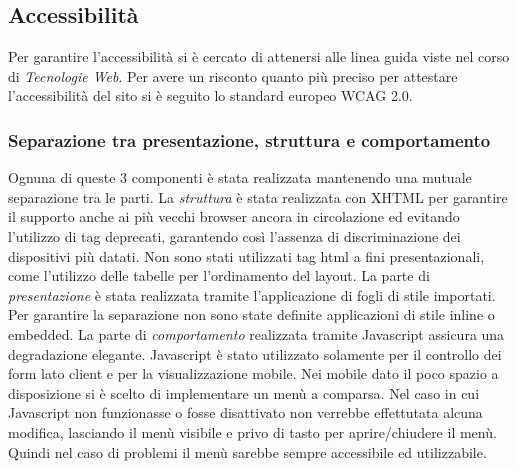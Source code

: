 \subsection{Accessibilità}
Per garantire l'accessibilità si è cercato di attenersi alle linea guida viste nel corso di \textit{Tecnologie Web}. Per avere un risconto quanto più preciso per attestare l'accessibilità del sito si è seguito lo standard europeo WCAG 2.0.
\subsubsection{Separazione tra presentazione, struttura e comportamento}
Ognuna di queste 3 componenti è stata realizzata mantenendo una mutuale separazione tra le parti. 
La \textit{struttura} è stata realizzata con XHTML per garantire il supporto anche ai più vecchi browser ancora in circolazione ed evitando l'utilizzo di tag deprecati, garantendo così l'assenza di discriminazione dei dispositivi più datati.
Non sono stati utilizzati tag html a fini presentazionali, come l'utilizzo delle tabelle per l'ordinamento del layout.
La parte di \textit{presentazione} è stata realizzata tramite l'applicazione di fogli di stile importati. Per garantire la separazione non sono state definite applicazioni di stile inline o embedded.
La parte di \textit{comportamento} realizzata tramite Javascript assicura una degradazione elegante. Javascript è stato utilizzato solamente per il controllo dei form lato client e per la visualizzazione mobile. Nei mobile dato il poco spazio a disposizione si è scelto di implementare un menù a comparsa. Nel caso in cui Javascript non funzionasse o fosse disattivato non verrebbe effettutata alcuna modifica, lasciando il menù visibile e privo di tasto per aprire/chiudere il menù. Quindi nel caso di problemi il menù sarebbe sempre accessibile ed utilizzabile.
